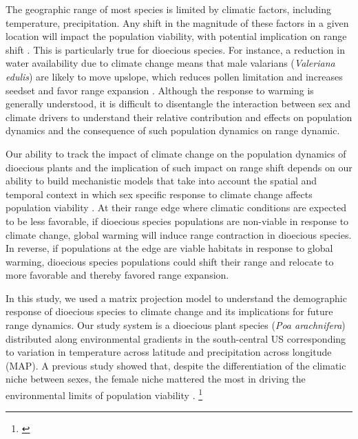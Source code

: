 \documentclass[11pt]{article}
\newcommand{\tom}[2]{{\color{red}{#1}}\footnote{\textit{\color{red}{#2}}}}
\begin{document}
The geographic range of most species is limited by climatic factors, including temperature, precipitation. 
Any shift in the magnitude of these factors in a given location will impact the population viability, with potential implication on range shift \citep{davis2001range, pease1989model}. 
This is particularly true for dioecious species.
For instance, a reduction in water availability due to climate change means that male valarians (\textit{Valeriana edulis}) are likely to move upslope, which reduces pollen limitation and increases seedset and favor range expansion \citep{petry2016sex}.
Although the response to warming is generally understood, it is difficult to disentangle the interaction between sex and climate drivers to understand their relative contribution and effects on population dynamics and the consequence of such population dynamics on range dynamic. 

Our ability to track the impact of climate change on the population dynamics of dioecious plants and the implication of such impact on range shift depends on our ability to build mechanistic models that take into account the spatial and temporal context in which sex specific response to climate change affects population viability \citep{davis2001range,evans2016towards,czachura2020demographic}.
At their range edge where climatic conditions are expected to be less favorable, if dioecious species populations are non-viable in response to climate change, global warming will induce range contraction in dioecious species.
In reverse, if populations at the edge are viable habitats in response to global warming, dioecious species populations could shift their range and relocate to more favorable and thereby favored range expansion. 

In this study, we used a matrix projection model to understand the demographic response of dioecious species to climate change and its implications for future range dynamics.
Our study system is a dioecious plant species (\textit{Poa arachnifera}) distributed along environmental gradients in the south-central US corresponding to variation in temperature across latitude and precipitation across longitude (MAP). 
A previous study showed that, despite the differentiation of the climatic niche between sexes, the female niche mattered the most in driving the environmental limits of population viability \citep{miller2022two}. 
\tom{Thus, under current climate conditions, we hypothesized that high temperature and lower precipitation during the growing season have negative effects on population growth rate through a reduction in female growth, survival, and fecundity rate. 
However, that reduction in population growth rate will not go below a viable population (population growth rate less than one) even at range edge. 
Future climate will exacerbate the effect of temperature and precipitation on female vital rates and drive population to extinction, particularly at range edge.}{These hypoheses / predictions are hard to follow. I think it would be helpful to identify 2-3 main questions that this study aims to address and describe these here at the end of the Intro. We could brainstorm these together. }
\end{document}
